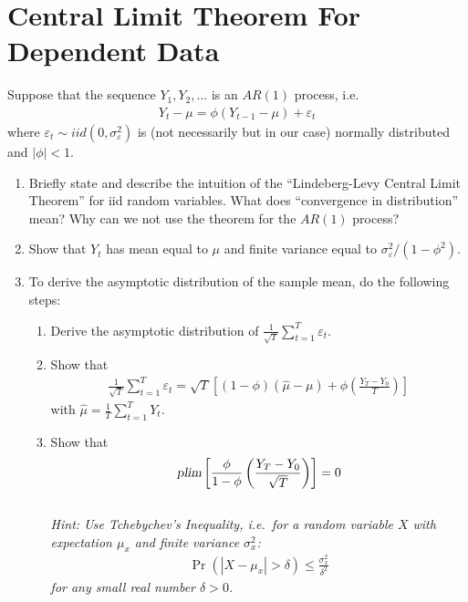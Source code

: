 \section[Central Limit Theorem For Dependent Data]{Central Limit Theorem For Dependent Data\label{ex:CentralLimitTheoremDependentData}}
Suppose that the sequence \(Y_{1},Y_{2},\ldots \) is an \(AR(1)\) process, i.e.
\begin{align*}
Y_{t}-\mu =\phi \left(Y_{t-1}-\mu\right) +\varepsilon _{t}
\end{align*}
where \(\varepsilon _{t}\sim iid(0,\sigma _{\varepsilon }^{2})\) is
(not necessarily but in our case) normally distributed and \(|\phi |<1\).

\begin{enumerate}
\item
Briefly state and describe the intuition of the \enquote{Lindeberg-Levy Central Limit Theorem} for iid random variables.
What does \enquote{convergence in distribution} mean?
Why can we not use the theorem for the \(AR(1)\) process?

\item
Show that \(Y_t\) has mean equal to \(\mu \) and finite variance equal to \(\sigma_\varepsilon^2/(1-\phi^2)\).

\item To derive the asymptotic distribution of the sample mean, do the following steps:
\begin{enumerate}
  \item
  Derive the asymptotic distribution of \(\frac{1}{\sqrt{T} } \sum_{t=1}^T \varepsilon_t\).

  \item
   Show that
  \begin{align*}
  \frac{1}{\sqrt{T}} \sum_{t=1}^T \varepsilon_t = \sqrt{T}\left[(1-\phi)\left(\hat{\mu}-\mu\right) + \phi\left(\frac{Y_T - Y_0}{T}\right)\right]
  \end{align*}
  with \(\hat{\mu} =\frac{1}{T}\sum_{t=1}^{T}Y_{t}\).

  \item
  Show that
  \begin{align*}
  \textsl{plim}\left[\frac{\phi}{1-\phi}\left(\frac{Y_T - Y_0}{\sqrt{T}}\right)\right] = 0
  \end{align*}
  \\
  \emph{Hint: Use Tchebychev's Inequality,
  i.e.\ for a random variable \(X\) with expectation \(\mu_x\)
  and finite variance \(\sigma_x^2\):}
  \begin{align*}
  \Pr(|X-\mu_x|> \delta) \leq \frac{\sigma_x^2}{\delta^2}
  \end{align*}
  \emph{for any small real number \(\delta>0\).}


\end{enumerate}
\end{enumerate}

